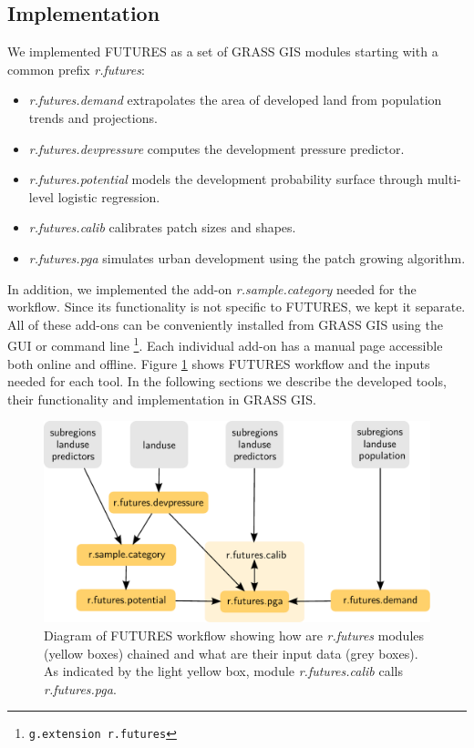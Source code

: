 \documentclass{isprs}
\begin{document}
\subsection{Implementation}
We implemented FUTURES as a set of GRASS GIS modules starting with a common prefix \emph{r.futures}:
\begin{itemize}[noitemsep,nolistsep]
 \item \emph{r.futures.demand} extrapolates the area of developed land from population trends and projections.
 \item \emph{r.futures.devpressure} computes the development pressure predictor.
 \item \emph{r.futures.potential} models the development probability surface through multi-level logistic regression.
 \item \emph{r.futures.calib} calibrates patch sizes and shapes.
 \item \emph{r.futures.pga} simulates urban development using the patch growing algorithm.
\end{itemize}
In addition, we implemented the add-on \emph{r.sample.category} needed for the workflow. 
Since its functionality is not specific to FUTURES, 
we kept it separate.
All of these add-ons can be conveniently installed from GRASS GIS using the GUI or command line%
\footnote{\texttt{g.extension r.futures}}. 
Each individual add-on has a manual page accessible both online and offline.
Figure \ref{fig:schemaGRASS} shows FUTURES workflow and the inputs needed for each tool.
In the following sections we describe the developed tools, their functionality and implementation in GRASS GIS.


\begin{figure}[h!]
 \centering
 \includegraphics[width=\columnwidth]{./figures/grass_futures_diagram.pdf}
 \caption{Diagram of FUTURES workflow showing how are \emph{r.futures} modules (yellow boxes) chained 
 and what are their input data (grey boxes). As indicated by the light yellow box,
 module \emph{r.futures.calib} calls \emph{r.futures.pga}.}
 \label{fig:schemaGRASS}
\end{figure}
\end{document}
